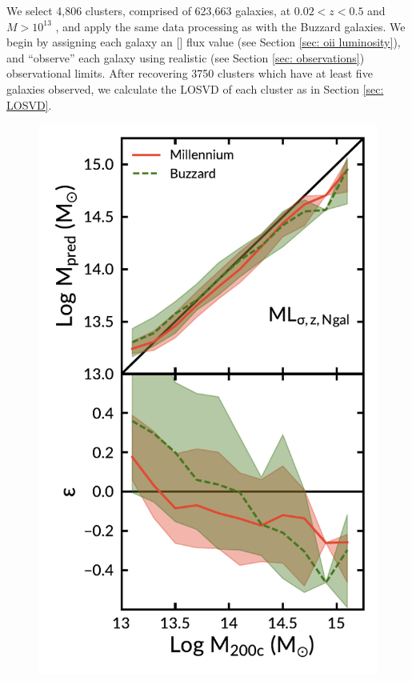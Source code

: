 \documentclass[fleqn,usenatbib]{mnras}
\begin{document}
We select 4,806 clusters, comprised of 623,663 galaxies, at $0.02 < z < 0.5$ and $M > 10^{13}$ \Msol, and apply the same data processing as with the Buzzard galaxies. We begin by assigning each galaxy an \hbox{[]} flux value (see Section \ref{sec: oii luminosity}), and ``observe'' each galaxy using realistic (see Section \ref{sec: observations}) observational limits. After recovering 3750 clusters which have at least five galaxies observed, we calculate the LOSVD of each cluster as in Section \ref{sec: LOSVD}. 

\begin{figure} 
	\includegraphics[width=\columnwidth]{figures/millBuzzComparison.pdf} 

\end{figure}
\end{document}
